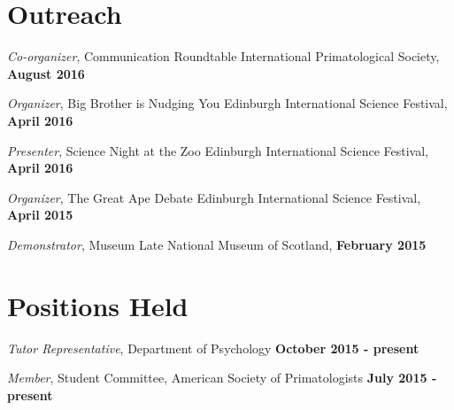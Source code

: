 \documentclass[margin,line]{res}
\begin{document}
\begin{resume}
\section{\sc Outreach} 


\vspace{-.2cm}
{\em Co-organizer}, Communication Roundtable \hfill International Primatological Society,  {\bf August 2016}\\
\vspace{-.5cm}

\vspace{-.2cm}
{\em Organizer}, Big Brother is Nudging You \hfill  Edinburgh International Science Festival,  {\bf April 2016}\\
\vspace{-.5cm}

\vspace{-.2cm}
{\em Presenter}, Science Night at the Zoo \hfill  Edinburgh International Science Festival,  {\bf April 2016}\\
\vspace{-.5cm}

\vspace{-.2cm}
{\em Organizer}, The Great Ape Debate \hfill  Edinburgh International Science Festival,  {\bf April 2015}\\
\vspace{-.5cm}

\vspace{-.2cm}
{\em Demonstrator}, Museum Late  \hfill  National Museum of Scotland,  {\bf February 2015}\\
\vspace{-.5cm}


\vspace{1cm}

\section{\sc Positions Held} 

\vspace{-.2cm}
{\em Tutor Representative}, Department of Psychology \hfill  {\bf October 2015 - present}\\
\vspace{-.5cm}

\vspace{-.2cm}
{\em Member}, Student Committee, American Society of Primatologists \hfill   {\bf July 2015 - present}\\
\vspace{-.5cm}


\end{resume}
\end{document}
